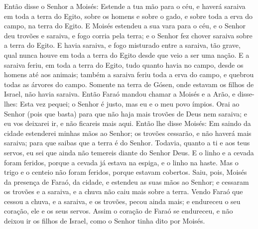 Então disse o Senhor a Moisés: Estende a tua mão para o céu, e
haverá saraiva em toda a terra do Egito, sobre os homens e sobre o
gado, e sobre toda a erva do campo, na terra do Egito. E
Moisés estendeu a sua vara para o céu, e o Senhor deu trovões e
saraiva, e fogo corria pela terra; e o Senhor fez chover saraiva
sobre a terra do Egito. E havia saraiva, e fogo misturado
entre a saraiva, tão grave, qual nunca houve em toda a terra do
Egito desde que veio a ser uma nação. E a saraiva feriu, em
toda a terra do Egito, tudo quanto havia no campo, desde os homens
até aos animais; também a saraiva feriu toda a erva do campo, e
quebrou todas as árvores do campo. Somente na terra de Gósen,
onde estavam os filhos de Israel, não havia saraiva. Então
Faraó mandou chamar a Moisés e a Arão, e disse-lhes: Esta vez
pequei; o Senhor é justo, mas eu e o meu povo ímpios. Orai ao
Senhor (pois que basta) para que não haja mais trovões de Deus nem
saraiva; e eu vos deixarei ir, e não ficareis mais aqui.
Então lhe disse Moisés: Em saindo da cidade estenderei minhas
mãos ao Senhor; os trovões cessarão, e não haverá mais saraiva; para
que saibas que a terra é do Senhor. Todavia, quanto a ti e
aos teus servos, eu sei que ainda não temereis diante do Senhor
Deus. E o linho e a cevada foram feridos, porque a cevada já
estava na espiga, e o linho na haste. Mas o trigo e o centeio
não foram feridos, porque estavam cobertos. Saiu, pois,
Moisés da presença de Faraó, da cidade, e estendeu as suas mãos ao
Senhor; e cessaram os trovões e a saraiva, e a chuva não caiu mais
sobre a terra. Vendo Faraó que cessou a chuva, e a saraiva, e
os trovões, pecou ainda mais; e endureceu o seu coração, ele e os
seus servos. Assim o coração de Faraó se endureceu, e não
deixou ir os filhos de Israel, como o Senhor tinha dito por Moisés.

\medskip


